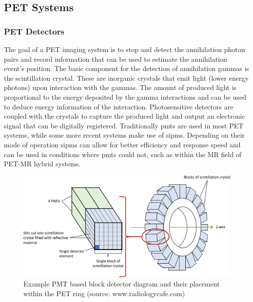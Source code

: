 \subsection{PET Systems}

\subsubsection{PET Detectors}
The goal of a PET imaging system is to stop and detect the annihilation photon pairs and record information that can be used to estimate the annihilation event's position.
The basic component for the detection of annihilation gammas is the scintillation crystal. These are inorganic crystals that emit light (lower energy photons) upon interaction with the gammas. The amount of produced light is proportional to the energy deposited by the gamma interactions and can be used to deduce energy information of the interaction. Photosensitive detectors are coupled with the crystals to capture the produced light and output an electronic signal that can be digitally registered. Traditionally \glspl{pmt} are used in most PET systems, while some more recent systems make use of \glspl{sipm}. Depending on their mode of operation \glspl{sipm} can allow for better efficiency and response speed and can be used in conditions where \glspl{pmt} could not, such as within the MR field of PET-MR hybrid systems.
%
\begin{figure} [h!]
\centering
\includegraphics[scale=0.25,angle=0]{2_Theory_Methods/figures/block_detector.png}
\caption{Example PMT based block detector diagram and their placement within the PET ring (source: www.radiologycafe.com) } 
\label{fig_2:BlockDetectorAndRing}
\end{figure} 
